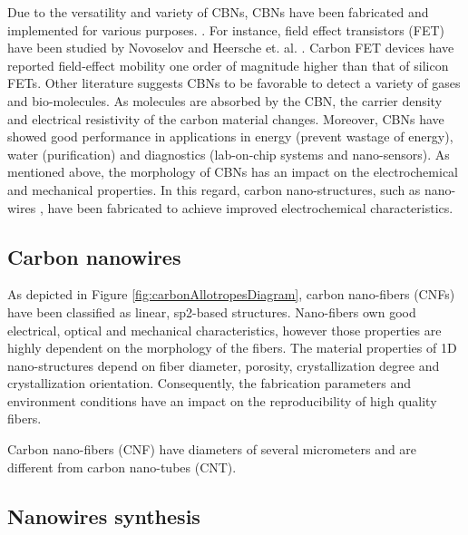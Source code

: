 Due to the versatility and variety of CBNs, CBNs have been fabricated and implemented for various purposes. \cite{Geim2011, Katsnelson2008, Li2008, Geim2007, Geim2009, Siddiqui2019}. For instance, field effect transistors (FET) have been studied by Novoselov \cite{Novoselov2004} and Heersche et. al. \cite{Heersche2007}. Carbon FET devices have reported field-effect mobility one order of magnitude higher than that of silicon FETs. Other literature suggests CBNs to be favorable to detect a variety of gases and bio-molecules. \cite{Schedin2007, Ohno2009} As molecules are absorbed by the CBN, the carrier density and electrical resistivity of the carbon material changes. Moreover, CBNs have showed good performance in applications in energy (prevent wastage of energy), water (purification) and diagnostics (lab-on-chip systems and nano-sensors). \cite{Cao2011, Khanna2016} As mentioned above, the morphology of CBNs has an impact on the electrochemical and mechanical properties. \cite{Marsh1989, Hugh1994, Guo2018} In this regard, carbon nano-structures, such as nano-wires \cite{Kundu2019, Bencheikh2019, Bencheikh2019}, have been fabricated to achieve improved electrochemical characteristics.

\subsection{Carbon nanowires}

As depicted in Figure \ref{fig:carbonAllotropesDiagram}, carbon nano-fibers (CNFs) have been classified as linear, sp2-based structures. \cite{Heersche2007, Heimann1997, Belenkov2003, Fedel2013, Razeghi2019, AlstrupJensen2015, Vajtai2013} Nano-fibers own good electrical, optical and mechanical characteristics, however those properties are highly dependent on the morphology of the fibers. \cite{Dresselhaus2007} The material properties of 1D nano-structures depend on fiber diameter, porosity, crystallization degree and crystallization orientation. Consequently, the fabrication parameters and environment conditions have an impact on the reproducibility of high quality fibers. \cite{Dresselhaus2007}

Carbon nano-fibers (CNF) have diameters of several micrometers and are different from carbon nano-tubes (CNT). \cite{Weil1992, Huang2009, chung2012carbon, Subramoney1997, Dresselhaus2000} 

\subsection{Nanowires synthesis}

